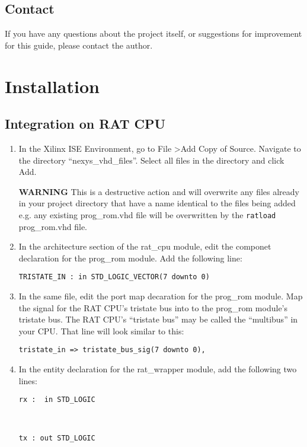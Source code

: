 \documentclass[notitlepage]{article}
\newcommand{\warningsign}{\fontencoding{U}\fontfamily{futs}\selectfont\char 66\relax}
\begin{document}
\subsection{Contact}
If you have any questions about the project itself, or suggestions for improvement for this guide, please contact the author.


\section{Installation}
\subsection{Integration on RAT CPU}
\begin{enumerate}
\item In the Xilinx ISE Environment, go to File \textgreater Add Copy of Source. Navigate to the directory ``nexys\_vhd\_files''. Select all files in the directory and click Add.

\begin{infobox}
\textbf{{\warningsign} WARNING} This is a destructive action and will overwrite any files already in your project directory that have a name identical to the files being added e.g. any existing prog\_rom.vhd file will be overwritten by the \texttt{ratload} prog\_rom.vhd file.
\end{infobox}

\item In the architecture section of the rat\_cpu module, edit the componet declaration for the prog\_rom module. Add the following line:\\
\centerline{\texttt{TRISTATE\_IN : in STD\_LOGIC\_VECTOR(7 downto 0)}}

\item In the same file, edit the port map decaration for the prog\_rom module. Map the signal for the RAT CPU's tristate bus into to the prog\_rom module's tristate bus. The RAT CPU's ``tristate bus'' may be called the ``multibus'' in your CPU. That line will look similar to this:\\
\centerline{\texttt{tristate\_in =\textgreater ~tristate\_bus\_sig(7 downto 0),}}

\item In the entity declaration for the rat\_wrapper module, add the following two lines:\\
\centerline{\texttt{rx : ~in STD\_LOGIC}}\\
\centerline{\texttt{tx : out STD\_LOGIC}}


\end{enumerate}
\end{document}

